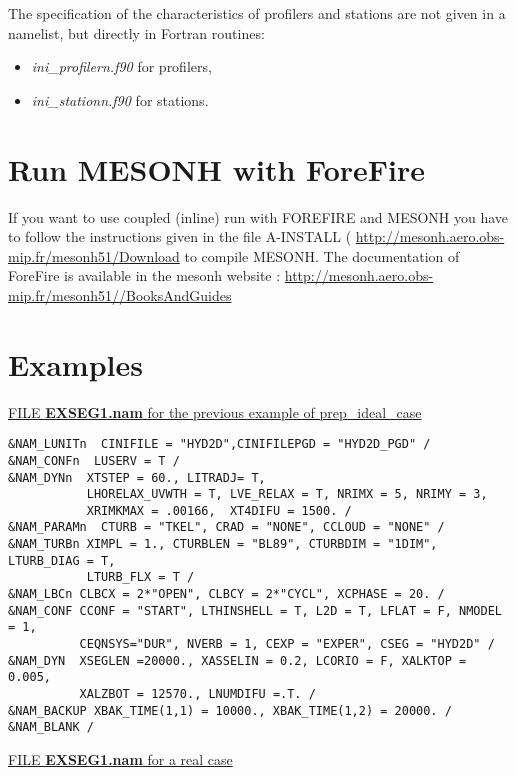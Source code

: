 The specification of the characteristics of profilers and stations are not
 given in a namelist, but directly in Fortran routines: 
\begin{itemize}
\item  {\it ini\_profilern.f90} for profilers,
\item  {\it ini\_stationn.f90} for stations.
\end{itemize}
\newpage
\section{Run MESONH with ForeFire}
 If you want to use coupled (inline) run with FOREFIRE and MESONH you have to follow the instructions given in  the file A-INSTALL ( \url{http://mesonh.aero.obs-mip.fr/mesonh51/Download} to compile MESONH.
The documentation of ForeFire  is available in the mesonh website : \url{http://mesonh.aero.obs-mip.fr/mesonh51//BooksAndGuides}


\section{Examples }

\underline{FILE {\bf EXSEG1.nam} for the previous example of prep\_ideal\_case}

\begin{verbatim}
&NAM_LUNITn  CINIFILE = "HYD2D",CINIFILEPGD = "HYD2D_PGD" /
&NAM_CONFn  LUSERV = T /
&NAM_DYNn  XTSTEP = 60., LITRADJ= T,
           LHORELAX_UVWTH = T, LVE_RELAX = T, NRIMX = 5, NRIMY = 3, 
           XRIMKMAX = .00166,  XT4DIFU = 1500. /
&NAM_PARAMn  CTURB = "TKEL", CRAD = "NONE", CCLOUD = "NONE" /
&NAM_TURBn XIMPL = 1., CTURBLEN = "BL89", CTURBDIM = "1DIM", LTURB_DIAG = T,
           LTURB_FLX = T /
&NAM_LBCn CLBCX = 2*"OPEN", CLBCY = 2*"CYCL", XCPHASE = 20. /
&NAM_CONF CCONF = "START", LTHINSHELL = T, L2D = T, LFLAT = F, NMODEL = 1, 
          CEQNSYS="DUR", NVERB = 1, CEXP = "EXPER", CSEG = "HYD2D" /
&NAM_DYN  XSEGLEN =20000., XASSELIN = 0.2, LCORIO = F, XALKTOP = 0.005,
          XALZBOT = 12570., LNUMDIFU =.T. /
&NAM_BACKUP XBAK_TIME(1,1) = 10000., XBAK_TIME(1,2) = 20000. /
&NAM_BLANK /
\end{verbatim}
\newpage
\underline{FILE {\bf EXSEG1.nam} for a real case}

